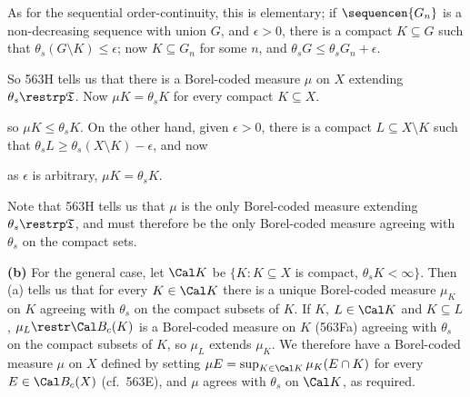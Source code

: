 {As for the sequential order-continuity, this is elementary;  if
$\sequencen{G_n}$ is a non-decreasing sequence with union $G$, and
$\epsilon>0$, there is a compact $K\subseteq G$ such that
$\theta_s(G\setminus K)\le\epsilon$;  now $K\subseteq G_n$ for some $n$,
and $\theta_sG\le\theta_sG_n+\epsilon$.\ \Qed

\medskip

 So 563H tells us that there is a Borel-coded
measure $\mu$ on $X$
extending $\theta_s\restrp\frak T$.   Now $\mu K=\theta_sK$ for every
compact $K\subseteq X$.   \Prf\


\noindent so $\mu K\le\theta_sK$.   On the other hand, given $\epsilon>0$,
there is a compact $L\subseteq X\setminus K$ such that
$\theta_sL\ge\theta_s(X\setminus K)-\epsilon$, and now


\noindent as $\epsilon$ is arbitrary, $\mu K=\theta_sK$.\ \Qed

\medskip

 Note that 563H tells us that $\mu$ is the only Borel-coded
measure extending $\theta_s\restrp\frak T$, and must therefore be the only
Borel-coded measure agreeing with $\theta_s$ on the compact sets.

\medskip

{\bf (b)} For the general case, let $\Cal K$ be
$\{K:K\subseteq X$ is compact, $\theta_sK<\infty\}$.
Then (a) tells us that for every $K\in\Cal K$ there is a unique Borel-coded measure
$\mu_K$ on $K$ agreeing with $\theta_s$ on the compact subsets of $K$.
If $K$, $L\in\Cal K$ and $K\subseteq L$, $\mu_L\restr\Cal B_c(K)$ is a
Borel-coded measure on $K$ (563Fa)
agreeing with $\theta_s$ on the compact subsets of $K$, so $\mu_L$ extends
$\mu_K$.   We therefore have a Borel-coded measure $\mu$ on $X$
defined by setting $\mu E=\sup_{K\in\Cal K}\mu_K(E\cap K)$ for every
$E\in\Cal B_c(X)$ (cf.\ 563E),
and $\mu$ agrees with $\theta_s$ on $\Cal K$, as required.
}%


